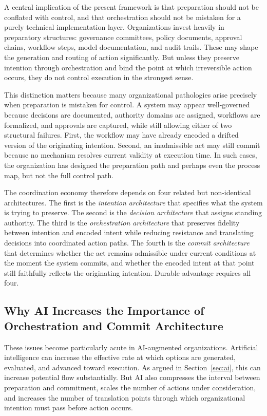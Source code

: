 \documentclass[12pt]{article}
\begin{document}
A central implication of the present framework is that preparation should not
be conflated with control, and that orchestration should not be mistaken for a
purely technical implementation layer. Organizations invest heavily in
preparatory structures: governance committees, policy documents, approval
chains, workflow steps, model documentation, and audit trails. These may shape
the generation and routing of action significantly. But unless they preserve
intention through orchestration and bind the point at which irreversible action
occurs, they do not control execution in the strongest sense.

This distinction matters because many organizational pathologies arise
precisely when preparation is mistaken for control. A system may appear
well-governed because decisions are documented, authority domains are assigned,
workflows are formalized, and approvals are captured, while still allowing
either of two structural failures. First, the workflow may have already encoded
a drifted version of the originating intention. Second, an inadmissible act
may still commit because no mechanism resolves current validity at execution
time. In such cases, the organization has designed the preparation path and
perhaps even the process map, but not the full control path.

The coordination economy therefore depends on four related but non-identical
architectures. The first is the \emph{intention architecture} that specifies
what the system is trying to preserve. The second is the \emph{decision
architecture} that assigns standing authority. The third is the
\emph{orchestration architecture} that preserves fidelity between intention
and encoded intent while reducing resistance and translating decisions into
coordinated action paths. The fourth is the \emph{commit architecture} that
determines whether the act remains admissible under current conditions at the
moment the system commits, and whether the encoded intent at that point still
faithfully reflects the originating intention. Durable advantage requires
all four.

\subsection{Why AI Increases the Importance of Orchestration and Commit Architecture}

These issues become particularly acute in AI-augmented organizations.
Artificial intelligence can increase the effective rate at which options are
generated, evaluated, and advanced toward execution. As argued in
Section~\ref{sec:ai}, this can increase potential flow substantially. But AI
also compresses the interval between preparation and commitment, scales the
number of actions under consideration, and increases the number of translation
points through which organizational intention must pass before action occurs.
\end{document}

